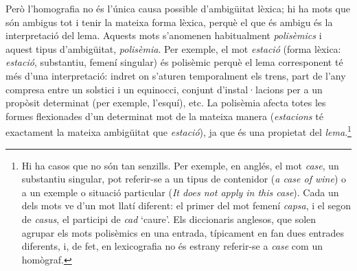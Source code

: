 Però l'homografia no és l'única causa possible d'ambigüitat lèxica; hi
ha mots que són ambigus tot i tenir la mateixa forma lèxica, perquè el
que és ambigu és la interpretació del lema. Aquests mots s'anomenen
habitualment \emph{polisèmics} i aquest tipus d'ambigüitat,
\emph{polisèmia}. Per exemple, el mot \emph{estació} (forma lèxica:
\emph{estació}, substantiu, femení singular) és polisèmic perquè el
lema corresponent té més d'una interpretació: indret on s'aturen
temporalment els trens, part de l'any compresa entre un solstici i un
equinocci, conjunt d'instal·lacions per a un propòsit determinat (per
exemple, l'esquí), etc. La polisèmia afecta totes les formes
flexionades d'un determinat mot de la mateixa manera (\emph{estacions}
té exactament la mateixa ambigüitat que \emph{estació}), ja que és una
propietat del \emph{lema}.\footnote{Hi ha casos que no són tan
  senzills. Per exemple, en anglés, el mot \emph{case}, un substantiu
  singular, pot referir-se a un tipus de contenidor (\emph{a case of
    wine}) o a un exemple o situació particular (\emph{It does not
    apply in this case}). Cada un dels mots ve d'un mot llatí
  diferent: el primer del mot femení \emph{capsa}, i el segon de
  \emph{casus}, el participi de \emph{cad} `caure'. Els
  diccionaris anglesos, que solen agrupar els mots polisèmics en una
  entrada, típicament en fan dues entrades diferents, i, de fet, en
  lexicografia no és estrany referir-se a \emph{case} com un
  homògraf.}

